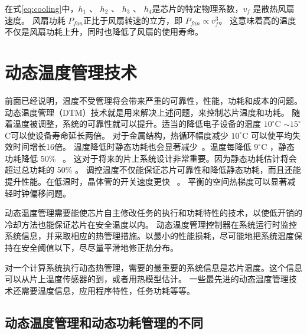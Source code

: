 在式\eqref{eq:cooling}中，$h_1$ 、 $h_2$ 、 $h_3$ 、 $h_4$是芯片的特定物理系数，$v_f$ 是散热风扇速度。
风扇功耗 $P_{fan}$正比于风扇转速的立方，即 $P_{fan} \propto v_f^3$。
这意味着高的温度不仅是风扇功耗上升，同时也降低了风扇的使用寿命。

\section{动态温度管理技术}\label{sec:DTM}

前面已经说明，温度不受管理将会带来严重的可靠性，性能，功耗和成本的问题。
动态温度管理（DTM）技术就是用来解决上述问题，来控制芯片温度和功耗。
随着温度被调整，系统的可靠性就可以提升。适当的降低电子设备的温度 $10^{\circ}$C $\sim 15^{\circ}$C可以使设备寿命延长两倍。
对于金属结构，热循环幅度减少 $10^{\circ}$C 可以使平均失效时间增长16倍。
温度降低时静态功耗也会显著减少~\cite{kursun2006investigating}。温度每降低 $9^{\circ}$C ，静态功耗降低 50\%~\cite{liu2007accurate} 。
这对于将来的片上系统设计非常重要。因为静态功耗估计将会超过总功耗的 50\% 。
调控温度不仅能保证芯片可靠性和降低静态功耗，而且还能提升性能。在低温时，晶体管的开关速度更快~\cite{pamula2003cooling} 。
平衡的空间热梯度可以显著减轻时钟偏移问题。

动态温度管理需要能使芯片自主修改任务的执行和功耗特性的技术，以使低开销的冷却方法也能保证芯片在安全温度以内。
动态温度管理控制器在系统运行时监控系统信息，并采取相应的热管理措施。以最小的性能损耗，尽可能地把系统温度保持在安全阈值以下，尽尽量平滑地修正热分布。

对一个计算系统执行动态热管理，需要的最重要的系统信息是芯片温度。这个信息可以从片上温度传感器的到，或者用热模型估计。
一些最先进的动态温度管理技术还需要温度信息，应用程序特性，任务功耗等等。

\subsection{动态温度管理和动态功耗管理的不同}\label{sec:DPM}


